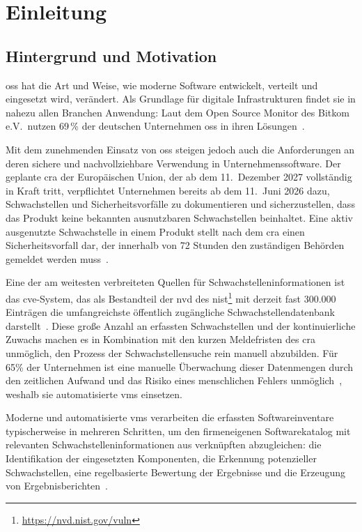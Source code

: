 \chapter{Einleitung}\label{ch:einleitung}


\section{Hintergrund und Motivation}\label{sec:hintergrund-motivation}

\acrfull{oss} hat die Art und Weise, wie moderne Software entwickelt, verteilt und eingesetzt wird, verändert.
Als Grundlage für digitale Infrastrukturen findet sie in nahezu allen Branchen Anwendung:
Laut dem Open Source Monitor des Bitkom e.V.\ nutzen 69\,\% der deutschen Unternehmen \acrshort{oss} in ihren Lösungen\ \autocite{OpenSourceMonitorWintergerst}.

Mit dem zunehmenden Einsatz von \acrshort{oss} steigen jedoch auch die Anforderungen an deren sichere und nachvollziehbare Verwendung in Unternehmenssoftware.
Der geplante \acrfull{cra} der Europäischen Union, der ab dem 11.\ Dezember 2027 vollständig in Kraft tritt,
verpflichtet Unternehmen bereits ab dem 11.\ Juni 2026 dazu, Schwachstellen und Sicherheitsvorfälle zu dokumentieren und sicherzustellen, dass das Produkt keine bekannten ausnutzbaren Schwachstellen beinhaltet.
Eine aktiv ausgenutzte Schwachstelle in einem Produkt stellt nach dem \acrshort{cra} einen Sicherheitsvorfall dar, der innerhalb von 72 Stunden den zuständigen Behörden gemeldet werden muss\ \autocite{eu2024cra}.

Eine der am weitesten verbreiteten Quellen für Schwachstelleninformationen ist das \acrfull{cve}-System, das als Bestandteil der \acrfull{nvd} des \acrfull{nist}\footnote{\url{https://nvd.nist.gov/vuln}} mit derzeit fast 300.000 Einträgen die umfangreichste öffentlich zugängliche Schwachstellendatenbank darstellt\ \autocite{nvd12mai2025dashboard}.
Diese große Anzahl an erfassten Schwachstellen und der kontinuierliche Zuwachs machen es in Kombination mit den kurzen Meldefristen des \acrshort{cra} unmöglich, den Prozess der Schwachstellensuche rein manuell abzubilden.
Für 65\% der Unternehmen ist eine manuelle Überwachung dieser Datenmengen durch den zeitlichen Aufwand und das Risiko eines menschlichen Fehlers unmöglich\ \autocite{OpenSourceMonitorWintergerst}, weshalb sie automatisierte \acrfull{vms} einsetzen.

Moderne und automatisierte \acrshort{vms} verarbeiten die erfassten Softwareinventare typischerweise in mehreren Schritten, um den firmeneigenen Softwarekatalog mit relevanten Schwachstelleninformationen aus verknüpften  abzugleichen:
die Identifikation der eingesetzten Komponenten, die Erkennung potenzieller Schwachstellen, eine regelbasierte Bewertung der Ergebnisse und die Erzeugung von Ergebnisberichten\ \autocite{Idrissi_Sebai_Faroukhi_Mahouachi_2024}.

